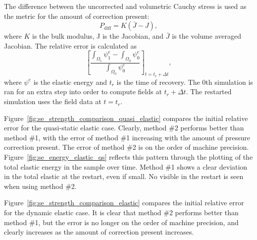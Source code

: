 The difference between the uncorrected and volumetric Cauchy stress is used as the metric for the amount of correction present:
\begin{equation}
    P_{\text{diff}} = K(\bar{J}-J),
\end{equation}
where $K$ is the bulk modulus, J is the Jacobian, and $\bar{J}$ is the volume averaged Jacobian. The relative error is calculated as
\begin{equation}
    \left[\frac{\int_{\Omega_1}\psi^e_1-\int_{\Omega_0}\psi^e_0}{\int_{\Omega_0}\psi^e_0}\right]_{t=t_r+\Delta t},
\end{equation}
where $\psi^e$ is the elastic energy and $t_r$ is the time of recovery. The 0th simulation is ran for an extra step into order to compute fields at $t_r+\Delta t$. The restarted simulation uses the field data at $t=t_r$.

Figure~\ref{fig:se_strength_comparison_quasi_elastic} compares the initial relative error for the quasi-static elastic case. Clearly, method \#2 performs better than method \#1, with the error of method \#1 increasing with the amount of pressure correction present. The error of method \#2 is on the order of machine precision. Figure~\ref{fig:se_energy_elastic_qs} reflects this pattern through the plotting of the total elastic energy in the sample over time. Method \#1 shows a clear deviation in the total elastic at the restart, even if small. No visible in the restart is seen when using method \#2.

Figure~\ref{fig:se_strength_comparison_elastic} compares the initial relative error for the dynamic elastic case. It is clear that method \#2 performs better than method \#1, but the error is no longer on the order of machine precision, and clearly increases as the amount of correction present increases.













\FloatBarrier{}



